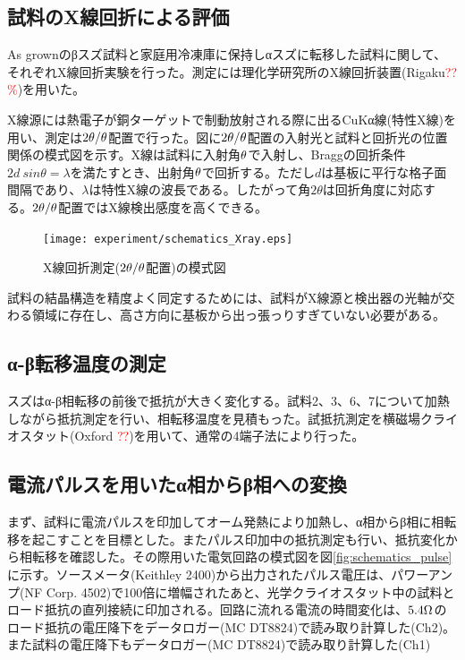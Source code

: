 \subsection{試料のX線回折による評価}
\label{sec:Xray_experiment}
As grownのβスズ試料と家庭用冷凍庫に保持しαスズに転移した試料に関して、それぞれX線回折実験を行った。測定には理化学研究所のX線回折装置(Rigaku\textcolor{red}{??\%})を用いた。

X線源には熱電子が銅ターゲットで制動放射される際に出るCuKα線(特性X線)を用い、測定は$\rm 2\theta/\theta$配置で行った。図に$\rm 2\theta/\theta$配置の入射光と試料と回折光の位置関係の模式図を示す。X線は試料に入射角$\rm \theta$で入射し、Braggの回折条件$2d\:sin\theta=\lambda$を満たすとき、出射角$\rm \theta$で回折する。ただし$d$は基板に平行な格子面間隔であり、$\lambda$は特性X線の波長である。したがって角$2\theta$は回折角度に対応する。$\rm 2\theta/\theta$配置ではX線検出感度を高くできる。
\begin{figure}[!h]
    \begin{center}
   \texttt{[image: experiment/schematics\_Xray.eps]}
  \end{center}
  \caption{X線回折測定($\rm 2\theta/\theta$配置)の模式図}
  \label{fig:schematics_Xray}
\end{figure}

試料の結晶構造を精度よく同定するためには、試料がX線源と検出器の光軸が交わる領域に存在し、高さ方向に基板から出っ張っりすぎていない必要がある。


\subsection{α-β転移温度の測定}
スズはα-β相転移の前後で抵抗が大きく変化する。試料2、3、6、7について加熱しながら抵抗測定を行い、相転移温度を見積もった。試抵抗測定を横磁場クライオスタット(Oxford \textcolor{red}{??})を用いて、通常の4端子法により行った。

\subsection{電流パルスを用いたα相からβ相への変換}
まず、試料に電流パルスを印加してオーム発熱により加熱し、α相からβ相に相転移を起こすことを目標とした。またパルス印加中の抵抗測定も行い、抵抗変化から相転移を確認した。その際用いた電気回路の模式図を図\ref{fig:schematics_pulse}に示す。ソースメータ(Keithley 2400)から出力されたパルス電圧は、パワーアンプ(NF Corp. 4502)で100倍に増幅されたあと、光学クライオスタット中の試料とロード抵抗の直列接続に印加される。回路に流れる電流の時間変化は、$\rm 5.4\Omega$のロード抵抗の電圧降下をデータロガー(MC DT8824)で読み取り計算した(Ch2)。また試料の電圧降下もデータロガー(MC DT8824)で読み取り計算した(Ch1)

